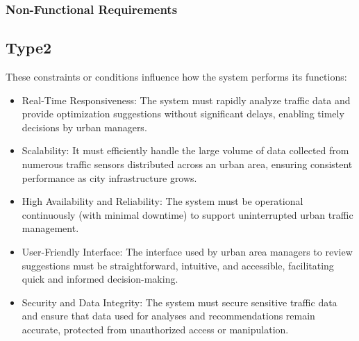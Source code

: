 \documentclass[a4paper,12pt]{article}
\begin{document}
\subsubsection{Non-Functional Requirements}
\subsection*{Type2}
These constraints or conditions influence how the system performs its functions:
\begin{itemize}
These constraints or conditions influence how the system performs its functions:
\item Real-Time Responsiveness: The system must rapidly analyze traffic data and provide optimization suggestions without significant delays, enabling timely decisions by urban managers.
\item Scalability: It must efficiently handle the large volume of data collected from numerous traffic sensors distributed across an urban area, ensuring consistent performance as city infrastructure grows.
\item High Availability and Reliability:
The system must be operational continuously (with minimal downtime) to support uninterrupted urban traffic management.
\item User-Friendly Interface: The interface used by urban area managers to review suggestions must be straightforward, intuitive, and accessible, facilitating quick and informed decision-making.
\item Security and Data Integrity: The system must secure sensitive traffic data and ensure that data used for analyses and recommendations remain accurate, protected from unauthorized access or manipulation.
\end{itemize}
\end{document}
